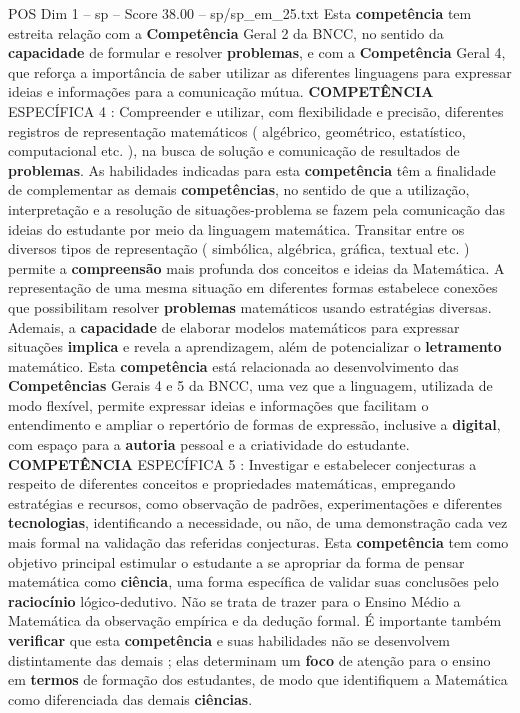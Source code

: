 \begin{textsample}{POS Dim 1 – sp – Score 38.00 – sp/sp\_em\_25.txt}
Esta \textbf{competência} tem estreita relação com a \textbf{Competência} Geral 2 da BNCC, no sentido da \textbf{capacidade} de formular e resolver \textbf{problemas}, e com a \textbf{Competência} Geral 4, que reforça a importância de saber utilizar as diferentes linguagens para expressar ideias e informações para a comunicação mútua. \textbf{COMPETÊNCIA} ESPECÍFICA 4 : Compreender e utilizar, com flexibilidade e precisão, diferentes registros de representação matemáticos ( algébrico, geométrico, estatístico, computacional etc. ), na busca de solução e comunicação de resultados de \textbf{problemas}.
As habilidades indicadas para esta \textbf{competência} têm a finalidade de complementar as demais \textbf{competências}, no sentido de que a utilização, interpretação e a resolução de situações-problema se fazem pela comunicação das ideias do estudante por meio da linguagem matemática.
Transitar entre os diversos tipos de representação ( simbólica, algébrica, gráfica, textual etc. ) permite a \textbf{compreensão} mais profunda dos conceitos e ideias da Matemática.
A representação de uma mesma situação em diferentes formas estabelece conexões que possibilitam resolver \textbf{problemas} matemáticos usando estratégias diversas.
Ademais, a \textbf{capacidade} de elaborar modelos matemáticos para expressar situações \textbf{implica} e revela a aprendizagem, além de potencializar o \textbf{letramento} matemático.
Esta \textbf{competência} está relacionada ao desenvolvimento das \textbf{Competências} Gerais 4 e 5 da BNCC, uma vez que a linguagem, utilizada de modo flexível, permite expressar ideias e informações que facilitam o entendimento e ampliar o repertório de formas de expressão, inclusive a \textbf{digital}, com espaço para a \textbf{autoria} pessoal e a criatividade do estudante. \textbf{COMPETÊNCIA} ESPECÍFICA 5 : Investigar e estabelecer conjecturas a respeito de diferentes conceitos e propriedades matemáticas, empregando estratégias e recursos, como observação de padrões, experimentações e diferentes \textbf{tecnologias}, identificando a necessidade, ou não, de uma demonstração cada vez mais formal na validação das referidas conjecturas.
Esta \textbf{competência} tem como objetivo principal estimular o estudante a se apropriar da forma de pensar matemática como \textbf{ciência}, uma forma específica de validar suas conclusões pelo \textbf{raciocínio} lógico-dedutivo.
Não se trata de trazer para o Ensino Médio a Matemática da observação empírica e da dedução formal.
É importante também \textbf{verificar} que esta \textbf{competência} e suas habilidades não se desenvolvem distintamente das demais ; elas determinam um \textbf{foco} de atenção para o ensino em \textbf{termos} de formação dos estudantes, de modo que identifiquem a Matemática como diferenciada das demais \textbf{ciências}.

\end{textsample}
